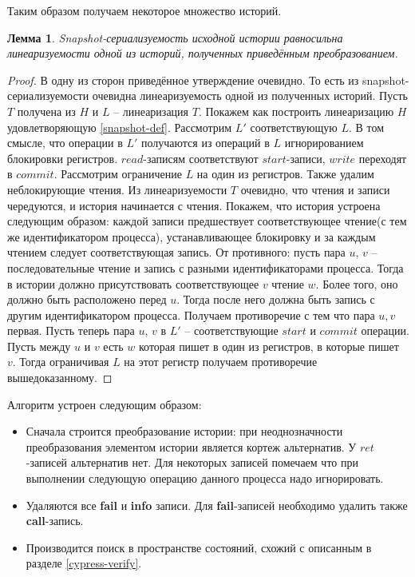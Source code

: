 \documentclass[pdftex,ptm,14pt,a4paper]{extreport}
\newtheorem{lemma}[theorem]{Лемма}
\theoremstyle{definition}
\begin{document}
Таким образом получаем некоторое множество историй.
\begin{lemma}
    Snapshot-сериализуемость исходной истории равносильна линеаризуемости одной из историй, полученных
    приведённым преобразованием.
\end{lemma}
\begin{proof}
    В одну из сторон приведённое утверждение очевидно. То есть из snapshot-сериализуемости очевидна линеаризуемость
    одной из полученных историй. Пусть $T$ получена из $H$ и $L$ -- линеаризация $T.$ Покажем как построить линеаризацию
    $H$ удовлетворяющую \ref{snapshot-def}. Рассмотрим $L'$ соответствующую $L.$ В том смысле, что операции в $L'$ получаются
    из операций в $L$ игнорированием блокировки регистров. $read$-записям соответствуют $start$-записи,
    $write$ переходят в $commit$. Рассмотрим ограничение $L$ на один из регистров. Также удалим неблокирующие чтения.
    Из линеаризуемости $T$ очевидно, что чтения и записи чередуются, и история начинается с чтения.
    Покажем, что история устроена следующим образом: каждой записи предшествует соответствующее чтение(с тем же идентификатором
    процесса), устанавливающее блокировку и за каждым чтением следует соответствующая запись. От противного: пусть пара $u$, $v$
    -- последовательные чтение и запись с разными идентификаторами процесса. Тогда в истории должно присутствовать соответствующее
    $v$ чтение $w$. Более того, оно должно быть расположено перед $u.$ Тогда после него должна быть запись с другим идентификатором
    процесса. Получаем противоречие с тем что пара $u, v$ первая. Пусть теперь пара $u$, $v$ в $L'$ -- соответствующие $start$ и
    $commit$ операции. Пусть между $u$ и $v$ есть $w$ которая пишет в один из регистров, в которые пишет $v.$ Тогда ограничивая $L$ на
    этот регистр получаем противоречие вышедоказанному.
\end{proof}

Алгоритм устроен следующим образом:
\begin{itemize}
    \item Сначала строится преобразование истории: при неоднозначности преобразования элементом истории является кортеж альтернатив.
        У $ret$-записей альтернатив нет. Для некоторых записей помечаем что при выполнении следующую операцию
        данного процесса надо игнорировать.
    \item Удаляются все \textbf{fail} и \textbf{info} записи. Для \textbf{fail}-записей необходимо удалить также \textbf{call}-запись.
    \item Производится поиск в пространстве состояний, схожий с описанным в разделе \ref{cypress-verify}.
\end{itemize}
\end{document}

